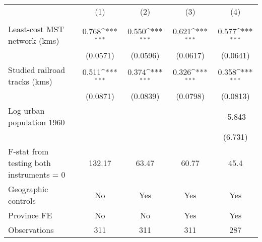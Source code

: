 {
\def\sym#1{\ifmmode^{#1}\else\(^{#1}\)\fi}
\begin{tabular}{l*{4}{c}}
\hline\hline
                &\multicolumn{1}{c}{(1)}&\multicolumn{1}{c}{(2)}&\multicolumn{1}{c}{(3)}&\multicolumn{1}{c}{(4)}\\
                &\multicolumn{1}{c}{}&\multicolumn{1}{c}{}&\multicolumn{1}{c}{}&\multicolumn{1}{c}{}\\
\hline
Least-cost MST network (kms)&    0.768\sym{***}&    0.550\sym{***}&    0.621\sym{***}&    0.577\sym{***}\\
                & (0.0571)         & (0.0596)         & (0.0617)         & (0.0641)         \\
[1em]
Studied railroad tracks (kms)&    0.511\sym{***}&    0.374\sym{***}&    0.326\sym{***}&    0.358\sym{***}\\
                & (0.0871)         & (0.0839)         & (0.0798)         & (0.0813)         \\
[1em]
Log urban population 1960&                  &                  &                  &   -5.843         \\
                &                  &                  &                  &  (6.731)         \\
\hline
F-stat from testing both instruments = 0&   132.17         &    63.47         &    60.77         &     45.4         \\
Geographic controls&       No         &      Yes         &      Yes         &      Yes         \\
Province FE     &       No         &       No         &      Yes         &      Yes         \\
Observations    &      311         &      311         &      311         &      287         \\
\hline\hline
\end{tabular}
}
